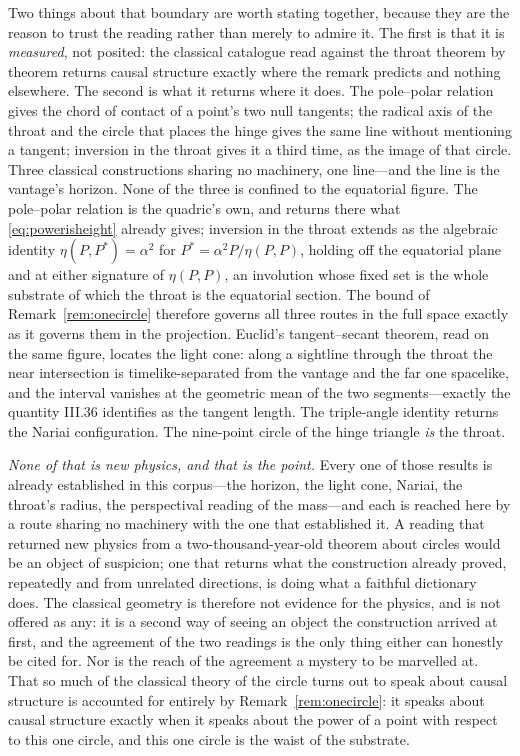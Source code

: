 \documentclass[11pt,a4paper]{article}
\theoremstyle{definition}
\begin{document}
Two things about that boundary are worth stating together, because they are the
reason to trust the reading rather than merely to admire it. The first is that it
is \emph{measured}, not posited: the classical catalogue read against the throat
theorem by theorem returns causal structure exactly where the remark predicts and
nothing elsewhere. The second is what it returns where it does. The pole--polar relation gives
the chord of contact of a point's two null tangents; the radical axis of the
throat and the circle that places the hinge gives the same line without mentioning
a tangent; inversion in the throat gives it a third time, as the image of that
circle. Three classical constructions sharing no machinery, one line---and the
line is the vantage's horizon. None of the three is confined to the equatorial
figure. The pole--polar relation is the quadric's own, and returns there what
\eqref{eq:powerisheight} already gives; inversion in
the throat extends as the algebraic identity $\eta(P,P^{*})=\alpha^{2}$ for
$P^{*}=\alpha^{2}P/\eta(P,P)$, holding off the equatorial plane and at either
signature of $\eta(P,P)$, an involution whose fixed set is the whole substrate
of which the throat is the equatorial section. The
bound of Remark~\ref{rem:onecircle} therefore governs all three routes in the
full space exactly as it governs them in the projection. Euclid's tangent--secant theorem, read on the same
figure, locates the light cone: along a sightline through the throat the near
intersection is timelike-separated from the vantage and the far one spacelike, and
the interval vanishes at the geometric mean of the two segments---exactly the
quantity III.36 identifies as the tangent length. The triple-angle identity returns
the Nariai configuration. The nine-point circle of the hinge triangle \emph{is} the
throat.

\emph{None of that is new physics, and that is the point.} Every one of those
results is already established in this corpus---the horizon, the light cone,
Nariai, the throat's radius, the perspectival reading of the mass---and each is
reached here by a route sharing no machinery with the one that established it. A
reading that returned new physics from a two-thousand-year-old theorem about
circles would be an object of suspicion; one that returns what the construction
already proved, repeatedly and from unrelated directions, is doing what a faithful
dictionary does. The classical geometry is therefore not evidence for the physics,
and is not offered as any: it is a second way of seeing an object the construction
arrived at first, and the agreement of the two readings is the only thing either
can honestly be cited for. Nor is the reach of the agreement a mystery to be
marvelled at. That so much of the classical theory of the circle turns out to speak
about causal structure is accounted for entirely by
Remark~\ref{rem:onecircle}: it speaks about causal structure exactly when it speaks
about the power of a point with respect to this one circle, and this one circle is
the waist of the substrate.
\end{document}
